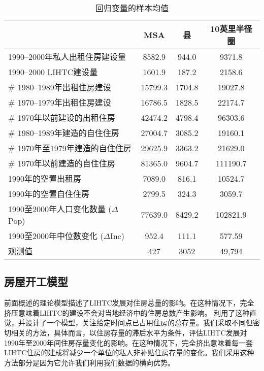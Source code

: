 \documentclass[lang=cn,11pt,a4paper]{paper}
\begin{document}
\renewcommand\arraystretch{1}
\begin{table}[h]
  \centering
  \setlength{\tabcolsep}{6mm}
    \caption{回归变量的样本均值}\label{tab3}
      \begin{tabular}{lccc}
        \toprule
        & \textbf{MSA} & \textbf{县} & \textbf{10英里半径圈} \\
        \midrule
        1990--2000年私人出租住房建设量 & 8582.9 & 944.0 &
        9371.8 \\
        1990--2000 LIHTC建设量  & 1601.9 & 187.2 & 2158.6 \\
        \# 1980--1989年出租住房建设 & 15799.3 & 1704.8 &
        19027.8 \\
        \# 1970--1979年出租住房建设 & 16786.5 & 1828.5 &
        22174.7 \\
        \# 1970年以前建设的出租住房 & 42474.2 & 4798.4 &
        96303.6 \\
        \# 1980--1989年建造的自住住房 & 27004.7 & 3085.2 &
        19160.1 \\
        \# 1970年至1979年建造的自住住房 & 29625.9 & 3363.2 &
        21629.0 \\
        \# 1970年以前建造的自住住房 & 81365.0 & 9604.7
        & 111190.7 \\
        1990年的空置出租房 & 7089.0 & 816.1 & 10524.7 \\
        1990年的空置自住住房 & 2799.5 & 324.3 &
        3059.7 \\
        1990至2000年人口变化数量 ($\Delta$Pop) & 77639.0 & 8429.2 &
        102821.9 \\
        1990至2000年中位数变化 ($\Delta$Inc) & 952.4 & 111.1 &
        577.59 \\
        观测值 & 427 & 3052 & 49,794 \\
        \bottomrule
      \end{tabular}
  \end{table}

\subsection{房屋开工模型}

前面概述的理论模型描述了LIHTC发展对住房总量的影响。在这种情况下，完全挤压意味着LIHTC的建设不会对当地经济中的住房总数产生影响。\cite{Sinai20052137} 利用了这种直觉，并设计了一个模型，关注给定时间点已占用住房的总存量。我们采取不同但密切相关的方法，具体而言，以住房存量的滞后水平为条件，评估LIHTC发展对1990年至2000年间住房存量变化的影响。在这种情况下，完全挤出意味着每一套LIHTC住房的建成将减少一个单位的私人非补贴住房存量的变化。我们采用这种方法部分是因为它允许我们利用我们数据的横向优势。
\end{document}
